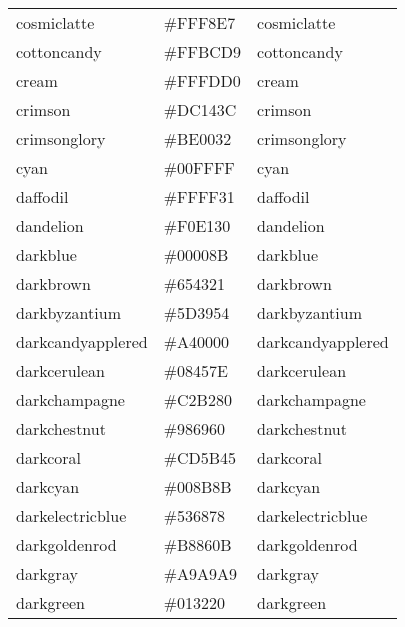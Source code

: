 \documentclass[
]{article}
\begin{document}
\begin{longtable}[]{@{}lll@{}}
cosmiclatte & \colorbox[rgb]{1.0,0.97,0.91}{\#FFF8E7} &
\textcolor[rgb]{1.0,0.97,0.91}{cosmiclatte           }\tabularnewline
cottoncandy & \colorbox[rgb]{1.0,0.74,0.85}{\#FFBCD9} &
\textcolor[rgb]{1.0,0.74,0.85}{cottoncandy           }\tabularnewline
cream & \colorbox[rgb]{1.0,0.99,0.82}{\#FFFDD0} &
\textcolor[rgb]{1.0,0.99,0.82}{cream                 }\tabularnewline
crimson & \colorbox[rgb]{0.86,0.08,0.24}{\#DC143C} &
\textcolor[rgb]{0.86,0.08,0.24}{crimson               }\tabularnewline
crimsonglory & \colorbox[rgb]{0.75,0.0,0.2}{\#BE0032} &
\textcolor[rgb]{0.75,0.0,0.2}{crimsonglory          }\tabularnewline
cyan & \colorbox[rgb]{0.0,1.0,1.0}{\#00FFFF} &
\textcolor[rgb]{0.0,1.0,1.0}{cyan                  }\tabularnewline
daffodil & \colorbox[rgb]{1.0,1.0,0.19}{\#FFFF31} &
\textcolor[rgb]{1.0,1.0,0.19}{daffodil              }\tabularnewline
dandelion & \colorbox[rgb]{0.94,0.88,0.19}{\#F0E130} &
\textcolor[rgb]{0.94,0.88,0.19}{dandelion             }\tabularnewline
darkblue & \colorbox[rgb]{0.0,0.0,0.55}{\#00008B} &
\textcolor[rgb]{0.0,0.0,0.55}{darkblue              }\tabularnewline
darkbrown & \colorbox[rgb]{0.4,0.26,0.13}{\#654321} &
\textcolor[rgb]{0.4,0.26,0.13}{darkbrown             }\tabularnewline
darkbyzantium & \colorbox[rgb]{0.36,0.22,0.33}{\#5D3954} &
\textcolor[rgb]{0.36,0.22,0.33}{darkbyzantium         }\tabularnewline
darkcandyapplered & \colorbox[rgb]{0.64,0.0,0.0}{\#A40000} &
\textcolor[rgb]{0.64,0.0,0.0}{darkcandyapplered     }\tabularnewline
darkcerulean & \colorbox[rgb]{0.03,0.27,0.49}{\#08457E} &
\textcolor[rgb]{0.03,0.27,0.49}{darkcerulean          }\tabularnewline
darkchampagne & \colorbox[rgb]{0.76,0.7,0.5}{\#C2B280} &
\textcolor[rgb]{0.76,0.7,0.5}{darkchampagne         }\tabularnewline
darkchestnut & \colorbox[rgb]{0.6,0.41,0.38}{\#986960} &
\textcolor[rgb]{0.6,0.41,0.38}{darkchestnut          }\tabularnewline
darkcoral & \colorbox[rgb]{0.8,0.36,0.27}{\#CD5B45} &
\textcolor[rgb]{0.8,0.36,0.27}{darkcoral             }\tabularnewline
darkcyan & \colorbox[rgb]{0.0,0.55,0.55}{\#008B8B} &
\textcolor[rgb]{0.0,0.55,0.55}{darkcyan              }\tabularnewline
darkelectricblue & \colorbox[rgb]{0.33,0.41,0.47}{\#536878} &
\textcolor[rgb]{0.33,0.41,0.47}{darkelectricblue      }\tabularnewline
darkgoldenrod & \colorbox[rgb]{0.72,0.53,0.04}{\#B8860B} &
\textcolor[rgb]{0.72,0.53,0.04}{darkgoldenrod         }\tabularnewline
darkgray & \colorbox[rgb]{0.66,0.66,0.66}{\#A9A9A9} &
\textcolor[rgb]{0.66,0.66,0.66}{darkgray              }\tabularnewline
darkgreen & \colorbox[rgb]{0.0,0.2,0.13}{\#013220} &
\textcolor[rgb]{0.0,0.2,0.13}{darkgreen             }\tabularnewline

\end{longtable}
\end{document}
